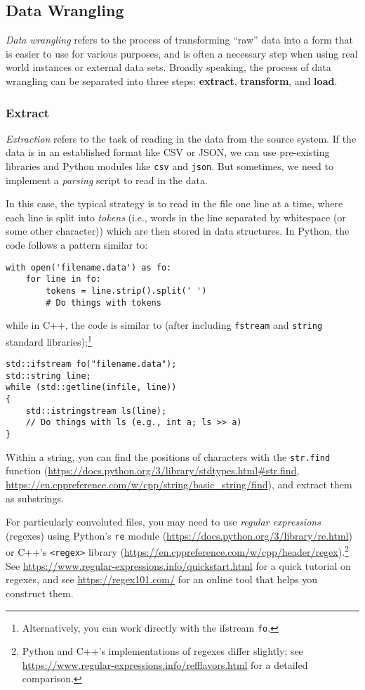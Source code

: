 \documentclass[12pt]{article}
\begin{document}
\subsection{Data Wrangling}
\emph{Data wrangling} refers to the process of transforming ``raw'' data into a form that is easier to use for various purposes, and is often a necessary step when using real world instances or external data sets. Broadly speaking, the process of data wrangling can be separated into three steps: \textbf{extract}, \textbf{transform}, and \textbf{load}.

\subsubsection{Extract}
\emph{Extraction} refers to the task of reading in the data from the source system.  If the data is in an established format like CSV or JSON, we can use pre-existing libraries and Python modules like \texttt{csv} and \texttt{json}. But sometimes, we need to implement a \emph{parsing} script to read in the data.

In this case, the typical strategy is to read in the file one line at a time, where each line is split into \emph{tokens} (i.e., words in the line separated by whitespace (or some other character)) which are then stored in data structures. In Python, the code follows a pattern similar to:
\begin{verbatim}
with open('filename.data') as fo:
    for line in fo:
        tokens = line.strip().split(' ')
        # Do things with tokens
\end{verbatim}
while in C++, the code is similar to (after including \texttt{fstream} and \texttt{string} standard libraries);\footnote{Alternatively, you can work directly with the ifstream \texttt{fo}.}
\begin{verbatim}
std::ifstream fo("filename.data");
std::string line;
while (std::getline(infile, line))
{
    std::istringstream ls(line);
	// Do things with ls (e.g., int a; ls >> a)
}
\end{verbatim}
Within a string, you can find the positions of characters with the \texttt{str.find} function (\url{https://docs.python.org/3/library/stdtypes.html#str.find}, \url{https://en.cppreference.com/w/cpp/string/basic_string/find}), and extract them as substrings.

For particularly convoluted files, you may need to use \emph{regular expressions} (regexes) using Python's \texttt{re} module (\url{https://docs.python.org/3/library/re.html}) or C++'s \texttt{<regex>} library (\url{https://en.cppreference.com/w/cpp/header/regex}).\footnote{Python and C++'s implementations of regexes differ slightly; see \url{https://www.regular-expressions.info/refflavors.html} for a detailed comparison.} See \url{https://www.regular-expressions.info/quickstart.html} for a quick tutorial on regexes, and see \url{https://regex101.com/} for an online tool that helps you construct them.
\end{document}
